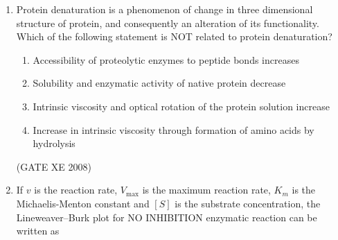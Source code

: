 \documentclass[12pt]{article}
\begin{document}
\begin{enumerate}
\begin{enumerate}
\end{enumerate}

(GATE XE 2008)

\item  Protein denaturation is a phenomenon of change in three dimensional structure of protein, and consequently an alteration of its functionality. Which of the following statement is NOT related to protein denaturation?  

\begin{enumerate}
\item  Accessibility of proteolytic enzymes to peptide bonds increases 
\item  Solubility and enzymatic activity of native protein decrease  
\item  Intrinsic viscosity and optical rotation of the protein solution increase  
\item  Increase in intrinsic viscosity through formation of amino acids by hydrolysis 
\end{enumerate}

(GATE XE 2008)

\item If $v$ is the reaction rate, $V_{\max}$ is the maximum reaction rate, $K_m$ is the Michaelis-Menton constant and $[S]$ is the substrate concentration, the Lineweaver–Burk plot for NO INHIBITION enzymatic reaction can be written as  

\begin{enumerate}
\end{enumerate}


\end{enumerate}
\end{document}
